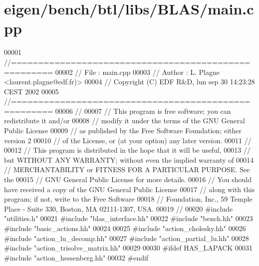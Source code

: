 \hypertarget{eigen_2bench_2btl_2libs_2_b_l_a_s_2main_8cpp_source}{}\section{eigen/bench/btl/libs/\+B\+L\+A\+S/main.cpp}
\label{eigen_2bench_2btl_2libs_2_b_l_a_s_2main_8cpp_source}

\begin{DoxyCode}
00001 \textcolor{comment}{//=====================================================}
00002 \textcolor{comment}{// File   :  main.cpp}
00003 \textcolor{comment}{// Author :  L. Plagne <laurent.plagne@edf.fr)>}
00004 \textcolor{comment}{// Copyright (C) EDF R&D,  lun sep 30 14:23:28 CEST 2002}
00005 \textcolor{comment}{//=====================================================}
00006 \textcolor{comment}{//}
00007 \textcolor{comment}{// This program is free software; you can redistribute it and/or}
00008 \textcolor{comment}{// modify it under the terms of the GNU General Public License}
00009 \textcolor{comment}{// as published by the Free Software Foundation; either version 2}
00010 \textcolor{comment}{// of the License, or (at your option) any later version.}
00011 \textcolor{comment}{//}
00012 \textcolor{comment}{// This program is distributed in the hope that it will be useful,}
00013 \textcolor{comment}{// but WITHOUT ANY WARRANTY; without even the implied warranty of}
00014 \textcolor{comment}{// MERCHANTABILITY or FITNESS FOR A PARTICULAR PURPOSE.  See the}
00015 \textcolor{comment}{// GNU General Public License for more details.}
00016 \textcolor{comment}{// You should have received a copy of the GNU General Public License}
00017 \textcolor{comment}{// along with this program; if not, write to the Free Software}
00018 \textcolor{comment}{// Foundation, Inc., 59 Temple Place - Suite 330, Boston, MA  02111-1307, USA.}
00019 \textcolor{comment}{//}
00020 \textcolor{preprocessor}{#include "utilities.h"}
00021 \textcolor{preprocessor}{#include "blas\_interface.hh"}
00022 \textcolor{preprocessor}{#include "bench.hh"}
00023 \textcolor{preprocessor}{#include "basic\_actions.hh"}
00024 
00025 \textcolor{preprocessor}{#include "action\_cholesky.hh"}
00026 \textcolor{preprocessor}{#include "action\_lu\_decomp.hh"}
00027 \textcolor{preprocessor}{#include "action\_partial\_lu.hh"}
00028 \textcolor{preprocessor}{#include "action\_trisolve\_matrix.hh"}
00029 
00030 \textcolor{preprocessor}{#ifdef HAS\_LAPACK}
00031 \textcolor{preprocessor}{#include "action\_hessenberg.hh"}
00032 \textcolor{preprocessor}{#endif}

\end{DoxyCode}
